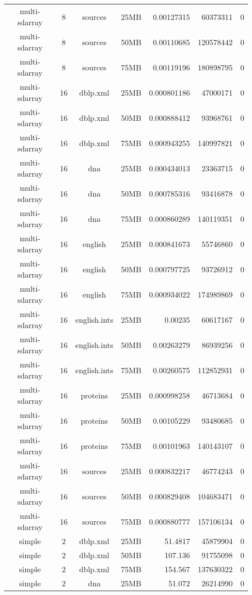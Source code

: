\begin{table}[h]
\begin{center}
\begin{tabular}{ccccrrr}
multi-sdarray & 8 & sources & 25MB & 0.00127315 & 60373311 & 0 \\
multi-sdarray & 8 & sources & 50MB & 0.00110685 & 120578442 & 0 \\
multi-sdarray & 8 & sources & 75MB & 0.00119196 & 180898795 & 0 \\
multi-sdarray & 16 & dblp.xml & 25MB & 0.000801186 & 47000171 & 0 \\
multi-sdarray & 16 & dblp.xml & 50MB & 0.000888412 & 93968761 & 0 \\
multi-sdarray & 16 & dblp.xml & 75MB & 0.000943255 & 140997821 & 0 \\
multi-sdarray & 16 & dna & 25MB & 0.000434013 & 23363715 & 0 \\
multi-sdarray & 16 & dna & 50MB & 0.000785316 & 93416878 & 0 \\
multi-sdarray & 16 & dna & 75MB & 0.000860289 & 140119351 & 0 \\
multi-sdarray & 16 & english & 25MB & 0.000841673 & 55746860 & 0 \\
multi-sdarray & 16 & english & 50MB & 0.000797725 & 93726912 & 0 \\
multi-sdarray & 16 & english & 75MB & 0.000934022 & 174989869 & 0 \\
multi-sdarray & 16 & english.ints & 25MB & 0.00235 & 60617167 & 0 \\
multi-sdarray & 16 & english.ints & 50MB & 0.00263279 & 86939256 & 0 \\
multi-sdarray & 16 & english.ints & 75MB & 0.00260575 & 112852931 & 0 \\
multi-sdarray & 16 & proteins & 25MB & 0.000998258 & 46713684 & 0 \\
multi-sdarray & 16 & proteins & 50MB & 0.00105229 & 93480685 & 0 \\
multi-sdarray & 16 & proteins & 75MB & 0.00101963 & 140143107 & 0 \\
multi-sdarray & 16 & sources & 25MB & 0.000832217 & 46774243 & 0 \\
multi-sdarray & 16 & sources & 50MB & 0.000829408 & 104683471 & 0 \\
multi-sdarray & 16 & sources & 75MB & 0.000880777 & 157106134 & 0 \\
simple & 2 & dblp.xml & 25MB & 51.4817 & 45879904 & 0 \\
simple & 2 & dblp.xml & 50MB & 107.136 & 91755098 & 0 \\
simple & 2 & dblp.xml & 75MB & 154.567 & 137630322 & 0 \\
simple & 2 & dna & 25MB & 51.072 & 26214990 & 0 \\

\end{tabular}
\end{center}
\end{table}
